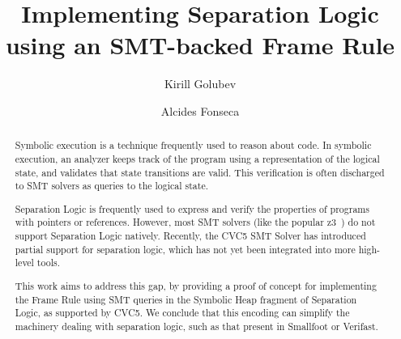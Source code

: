 \documentclass[sigplan,screen,review]{acmart}
\begin{document}
\title[Implementing Separation Logic using an SMT-backed Frame Rule]{Implementing Separation Logic \\ using an SMT-backed Frame Rule}

\author{Kirill Golubev}

\author{Alcides Fonseca}

\begin{abstract}

Symbolic execution is a technique frequently used to reason about code. In symbolic execution, an analyzer keeps track of the program using a representation of the logical state, and validates that state transitions are valid. This verification is often discharged to SMT solvers as queries to the logical state.

Separation Logic is frequently used to express and verify the properties of programs with pointers or references. However, most SMT solvers (like the popular z3~\cite{DBLP:conf/tacas/MouraB08}) do not support Separation Logic natively. Recently, the CVC5 SMT Solver has introduced partial support for separation logic, which has not yet been integrated into more high-level tools.

This work aims to address this gap, by providing a proof of concept for implementing the Frame Rule using SMT queries in the Symbolic Heap fragment of Separation Logic, as supported by CVC5. We conclude that this encoding can simplify the machinery dealing with separation logic, such as that present in Smallfoot or Verifast.

\end{abstract}
\end{document}

